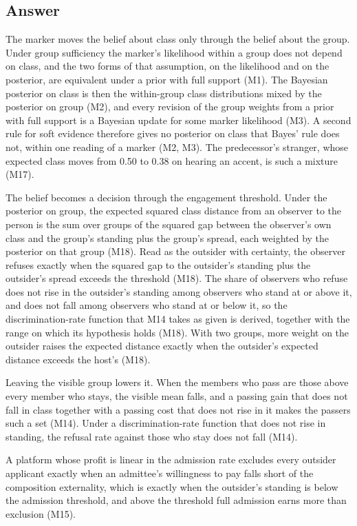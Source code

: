 \subsection{Answer}

The marker moves the belief about class only through the belief about the
group. Under group sufficiency the marker's likelihood within a group does
not depend on class, and the two forms of that assumption, on the likelihood
and on the posterior, are equivalent under a prior with full support (M1).
The Bayesian posterior on class is then the within-group class distributions
mixed by the posterior on group (M2), and every revision of the group
weights from a prior with full support is a Bayesian update for some marker
likelihood (M3). A second rule for soft evidence therefore gives no posterior
on class that Bayes' rule does not, within one reading of a marker (M2, M3).
The predecessor's stranger, whose expected class moves from 0.50 to 0.38 on
hearing an accent, is such a mixture (M17).

The belief becomes a decision through the engagement threshold. Under the
posterior on group, the expected squared class distance from an observer to
the person is the sum over groups of the squared gap between the observer's
own class and the group's standing plus the group's spread, each weighted by
the posterior on that group (M18). Read as the outsider with certainty, the
observer refuses exactly when the squared gap to the outsider's standing plus
the outsider's spread exceeds the threshold (M18). The share of observers who
refuse does not rise in the outsider's standing among observers who stand at
or above it, and does not fall among observers who stand at or below it, so
the discrimination-rate function that M14 takes as given is derived, together
with the range on which its hypothesis holds (M18). With two groups, more
weight on the outsider raises the expected distance exactly when the
outsider's expected distance exceeds the host's (M18).

Leaving the visible group lowers it. When the members who pass are those
above every member who stays, the visible mean falls, and a passing gain
that does not fall in class together with a passing cost that does not rise
in it makes the passers such a set (M14). Under a discrimination-rate
function that does not rise in standing, the refusal rate against those who
stay does not fall (M14).

A platform whose profit is linear in the admission rate excludes every
outsider applicant exactly when an admittee's willingness to pay falls short
of the composition externality, which is exactly when the outsider's
standing is below the admission threshold, and above the threshold full
admission earns more than exclusion (M15).

